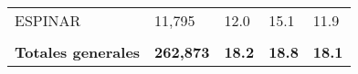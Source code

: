 \begin{tabular}{lllll}
	\cellcolor[HTML]{FF5050}ESPINAR                                & 11,795                                                                & 12.0                                                                             & 15.1                                                                        & 11.9                                                                                \\
	&                                                                       &                                                                                  &                                                                             &                                                                                     \\
	\rowcolor[HTML]{DDEBF7} 
	\textbf{Totales generales}                                     & \textbf{262,873}                                                      & \textbf{18.2}                                                                    & \textbf{18.8}                                                               & \textbf{18.1}                                                                      
\end{tabular}